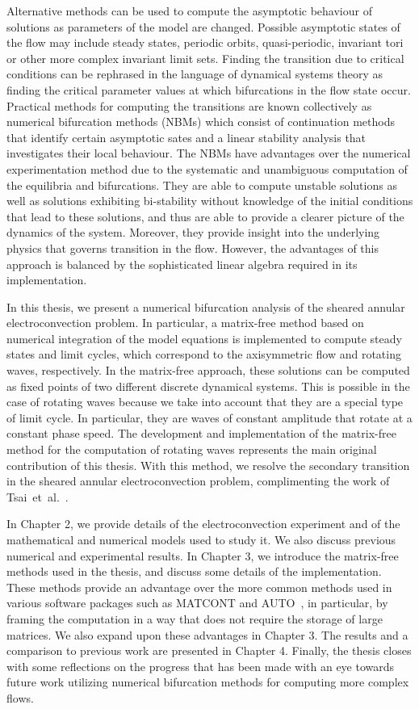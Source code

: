 Alternative methods can be used to compute the asymptotic behaviour of solutions as parameters of the model are changed.    Possible asymptotic states of the flow may include steady states, periodic orbits, {quasi-periodic}, invariant tori or other more complex invariant limit sets. Finding the transition due to critical conditions can be rephrased in the language of dynamical systems theory as finding the critical parameter values at which bifurcations in the flow state occur. Practical methods for computing the transitions are known collectively as numerical bifurcation methods (NBMs) which consist of continuation methods that identify certain asymptotic sates and a linear stability analysis that investigates their local behaviour. The NBMs have advantages over the numerical experimentation method due to the systematic and unambiguous computation of the equilibria and bifurcations. They are able to compute unstable solutions as well as solutions exhibiting {bi-stability} without knowledge of the initial conditions that lead to these solutions, and thus are able to provide a clearer picture of the dynamics of the system. Moreover, they provide insight into the underlying physics that governs transition in the flow. However, the advantages of this approach is balanced by the sophisticated linear algebra required in its implementation.

In this thesis, we present a numerical bifurcation analysis of the sheared annular electroconvection problem. In particular, a matrix-free method based on numerical integration of the model equations is implemented to compute steady states and limit cycles, which correspond to the axisymmetric flow and rotating waves, respectively. In the matrix-free approach, these solutions can be computed as fixed points of two different discrete dynamical systems. This is possible in the case of rotating waves because we take into account that they are a special type of limit cycle. In particular, they are waves of constant amplitude that rotate at a constant phase speed.  The development and implementation of the matrix-free method for the computation of rotating waves represents the main original contribution of this thesis. With this method, we resolve the secondary transition in the sheared annular electroconvection problem, complimenting the work of Tsai~et~al.~\cite{EDCTAFUCF,BAEWIS,AEWSDaDe,linearstability,WNAEISFF,Annular}.

In Chapter 2, we provide details of the electroconvection experiment and of the mathematical and numerical models used to study it. We also discuss previous numerical and experimental results. In Chapter 3, we introduce the matrix-free methods used in the thesis, and discuss some details of the implementation. These methods provide an advantage over the more common methods used in various software packages such as MATCONT and AUTO~\cite{MATCONT}, in particular, by framing the computation in a way that does not require the storage of large matrices. We also expand upon these advantages in Chapter 3. The results and a comparison to previous work are presented in Chapter 4. Finally, the thesis closes with some reflections on the progress that has been made with an eye towards future work utilizing numerical bifurcation methods for computing more complex flows.

